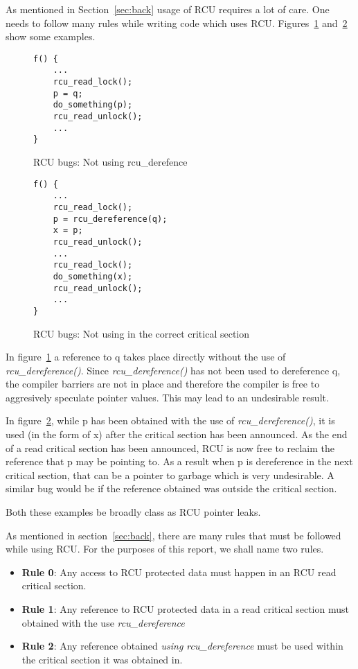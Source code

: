 As mentioned in Section~\ref{sec:back} usage of RCU requires a lot of care. One needs to follow many rules while writing code which uses RCU. Figures~\ref{fig:rcuderefbug} and~\ref{fig:rcuusebug} show some examples.

\begin{figure}[h]
\centering
\begin{lstlisting}
f() {
	...
	rcu_read_lock();
	p = q;
	do_something(p);
	rcu_read_unlock();
	...
}
\end{lstlisting}
\caption{RCU bugs: Not using rcu\_derefence}\label{fig:rcuderefbug}
\end{figure}

\begin{figure}[h]
\centering
\begin{lstlisting}
f() {
	...
	rcu_read_lock();
	p = rcu_dereference(q);
	x = p;
	rcu_read_unlock();
	...
	rcu_read_lock();
	do_something(x);
	rcu_read_unlock();
	...
}
\end{lstlisting}
\caption{RCU bugs: Not using in the correct critical section}\label{fig:rcuusebug}
\end{figure}

In figure~\ref{fig:rcuderefbug} a reference to q takes place directly without the use
of \emph{rcu\_dereference()}. Since \emph{rcu\_dereference()} has not been used to
dereference q, the compiler barriers are not in place and therefore the compiler
is free to aggresively speculate pointer values. This may lead to an undesirable
result.

In figure~\ref{fig:rcuusebug}, while p has been obtained with the
use of \emph{rcu\_dereference()}, it is used (in the form of x) after the critical section
has been announced. As the end of a read critical section has been announced,
RCU is now free to reclaim the reference that p may be pointing to. As a result
when p is dereference in the next critical section, that can be a pointer to
garbage which is very undesirable.  A similar bug would be if the reference
obtained was outside the critical section.

Both these examples be broadly class as RCU pointer leaks.

As mentioned in section~\ref{sec:back}, there are many rules that must be followed
while using RCU. For the purposes of this report, we shall name two rules.
\begin{itemize}
\item{\bf Rule 0}: Any access to RCU protected data must happen in an RCU read critical section.
\item{\bf Rule 1}: Any reference to RCU protected data in a read critical section must obtained with the use \emph{rcu\_dereference}
\item{\bf Rule 2}: Any reference obtained \emph{using rcu\_dereference} must be used within the critical section it was obtained in.
\end{itemize}

